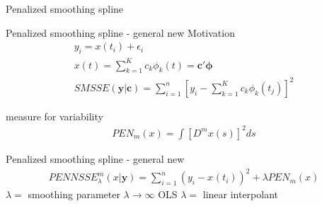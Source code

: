 \documentclass[hyperref={pdfpagelabels=false}]{beamer}
\begin{document}
\begin{frame}
\centering
Penalized smoothing spline
\end{frame}





\begin{frame}{Penalized smoothing spline - general new }
Motivation %
\begin{align*} 
y_i=x(t_i)+\epsilon_i \\ x(t)=\sum_{k=1}^Kc_k\phi_k(t)=\mathbf{c'}\boldsymbol{\phi} \\ 
SMSSE(\mathbf{y}|\mathbf{c})=\sum_{i=1}^n[y_i-\sum_{k=1}^Kc_k\phi_k(t_j)]^2
\end{align*}

measure for variability
\begin{align*}
PEN_m(x)=\int[D^mx(s)]^2ds
\end{align*}
\end{frame} %


\begin{frame}{Penalized smoothing spline - general new } %
\begin{align*}
PENNSSE^{m}_{\lambda}(x|\mathbf{y})=\sum_{i=1}^n (y_i^{}-x^{}(t_i))^2+\lambda PEN_m(x)
\end{align*}
$\lambda = $ smoothing parameter
$\lambda \rightarrow \infty $ OLS
$\lambda = $ linear interpolant

\end{frame}
\end{document}
